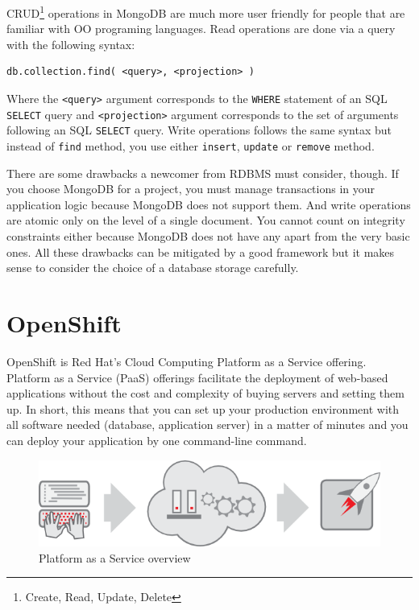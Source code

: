 CRUD\footnote{Create, Read, Update, Delete} operations in MongoDB are much more user friendly for people that are familiar with OO programing languages. Read operations are done via a query with the following syntax:

\begin{verbatim}
db.collection.find( <query>, <projection> )
\end{verbatim}

Where the \texttt{<query>} argument corresponds to the \texttt{WHERE} statement of an SQL \texttt{SELECT} query and \texttt{<projection>} argument corresponds to the set of arguments following an SQL \texttt{SELECT} query. Write operations follows the same syntax but instead of \texttt{find} method, you use either \texttt{insert}, \texttt{update} or \texttt{remove} method.

There are some drawbacks a newcomer from RDBMS must consider, though. If you choose MongoDB for a project, you must manage transactions in your application logic because MongoDB does not support them. And write operations are atomic only on the level of a single document. You cannot count on integrity constraints either because MongoDB does not have any apart from the very basic ones. All these drawbacks can be mitigated by a good framework but it makes sense to consider the choice of a database storage carefully.

\section{OpenShift}

OpenShift is Red Hat's Cloud Computing Platform as a Service offering\cite{openshift-homepage}. Platform as a Service (PaaS) offerings facilitate the deployment of web-based applications without the cost and complexity of buying servers and setting them up\cite{guardian-google-paas}. In short, this means that you can set up your production environment with all software needed (database, application server) in a matter of minutes and you can deploy your application by one command-line command.

\begin{figure}[htbp]
    \centering
        \includegraphics[scale=0.5]{./images/overview-paas.png}
    \caption{Platform as a Service overview}
\end{figure}

